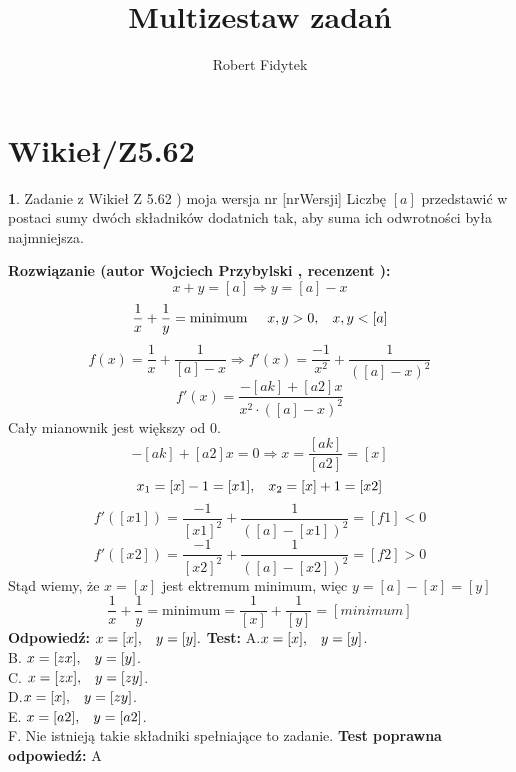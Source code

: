\documentclass[12pt, a4paper]{article}
\title{Multizestaw zadań}
\author{Robert Fidytek}
\date{}
\theoremstyle{definition} %
\newtheorem{zad}{}
\newcommand{\kategoria}[1]{\section{#1}} %
\newcommand{\zadStart}[1]{\begin{zad}#1\newline} %
\newcommand{\zadStop}{\end{zad}}   %
\newcommand{\rozwStart}[2]{\noindent \textbf{Rozwiązanie (autor #1 , recenzent #2): }\newline} %
\newcommand{\rozwStop}{\newline}                                            %
\newcommand{\odpStart}{\noindent \textbf{Odpowiedź:}\newline}    %
\newcommand{\odpStop}{\newline}                                             %
\newcommand{\testStart}{\noindent \textbf{Test:}\newline} %
\newcommand{\testStop}{\newline} %
\newcommand{\kluczStart}{\noindent \textbf{Test poprawna odpowiedź:}\newline} %
\newcommand{\kluczStop}{\newline} %
\begin{document}
\maketitle


\kategoria{Wikieł/Z5.62}
\zadStart{Zadanie z Wikieł Z 5.62 ) moja wersja nr [nrWersji]}
Liczbę $[a]$ przedstawić w postaci sumy dwóch składników dodatnich tak, aby suma ich odwrotności była najmniejsza.
\zadStop
\rozwStart{Wojciech Przybylski}{}
$$x+y=[a] \Rightarrow y=[a]-x$$
$$\frac{1}{x}+\frac{1}{y}=\mbox{minimum}\hspace{5mm} x,y>0,\hspace{3mm}x,y<[a]$$
$$f(x)=\frac{1}{x}+\frac{1}{[a]-x} \Rightarrow f'(x)=\frac{-1}{x^{2}}+\frac{1}{([a]-x)^{2}}$$
$$f'(x)=\frac{-[ak]+[a2]x}{x^{2}\cdot([a]-x)^{2}}$$
Cały mianownik jest większy od 0.
$$-[ak]+[a2]x=0 \Rightarrow x=\frac{[ak]}{[a2]}=[x]$$
$$x_{1}=[x]-1=[x1], \hspace{3mm} x_{2}=[x]+1=[x2]$$
$$f'([x1])=\frac{-1}{[x1]^{2}}+\frac{1}{([a]-[x1])^{2}}=[f1]<0$$
$$f'([x2])=\frac{-1}{[x2]^{2}}+\frac{1}{([a]-[x2])^{2}}=[f2]>0$$
Stąd wiemy, że $x=[x]$ jest ektremum minimum, więc $y=[a]-[x]=[y]$
$$\frac{1}{x}+\frac{1}{y}=\mbox{minimum}=\frac{1}{[x]}+\frac{1}{[y]}=[minimum]$$
\rozwStop
\odpStart
$x=[x], \hspace{3mm} y=[y].$
\odpStop
\testStart
A.$x=[x], \hspace{3mm} y=[y]$.\\
B. $x=[zx], \hspace{3mm} y=[y]$.\\
C. $x=[zx], \hspace{3mm} y=[zy]$.\\
D.$x=[x], \hspace{3mm} y=[zy]$.\\
E. $x=[a2], \hspace{3mm} y=[a2]$.\\
F. Nie istnieją takie składniki spełniające to zadanie.
\testStop
\kluczStart
A
\kluczStop
\end{document}

